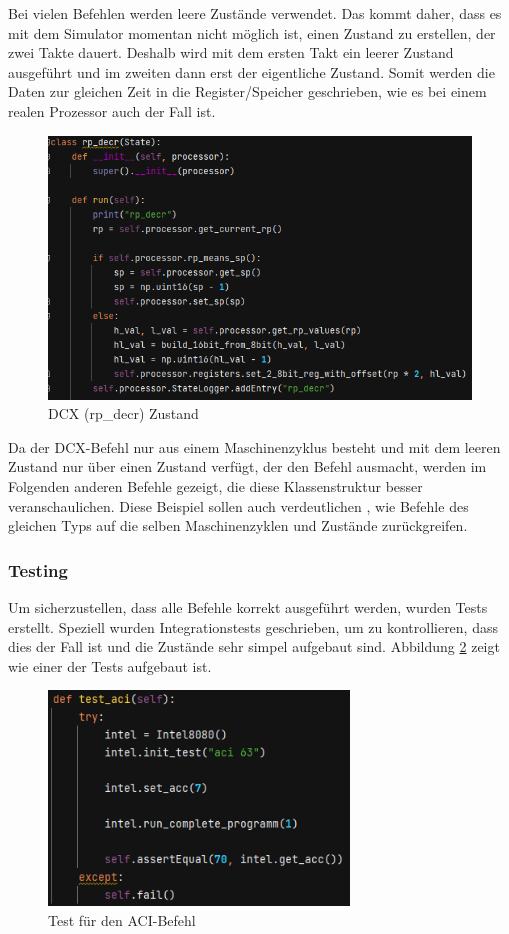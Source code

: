 \documentclass[12pt]{article}
\newcommand{\imgSpaceBefore}{\vspace{10pt}}
\begin{document}
\noindent
Bei vielen Befehlen werden leere Zustände verwendet. Das kommt daher, dass es mit dem Simulator momentan nicht möglich ist, einen Zustand zu erstellen, der zwei Takte dauert. Deshalb wird mit dem ersten Takt ein leerer Zustand ausgeführt und im zweiten dann erst der eigentliche Zustand. Somit werden die Daten zur gleichen Zeit in die Register/Speicher geschrieben, wie es bei einem realen Prozessor auch der Fall ist.

\imgSpaceBefore
\begin{figure}[H]
\centering
\includegraphics[width=14cm]{bilder/dcx_state}
\caption{DCX (rp\_decr) Zustand}
\label{fig:Dcx_state}
\end{figure}

\noindent
Da der DCX-Befehl nur aus einem Maschinenzyklus besteht und mit dem leeren Zustand nur über einen Zustand verfügt, der den Befehl ausmacht, werden im Folgenden anderen Befehle gezeigt, die diese Klassenstruktur besser veranschaulichen. Diese Beispiel sollen auch verdeutlichen , wie Befehle des gleichen Typs auf die selben Maschinenzyklen und Zustände zurückgreifen.

\subsubsection{Testing}
Um sicherzustellen, dass alle Befehle korrekt ausgeführt werden, wurden Tests erstellt. 
Speziell wurden Integrationstests geschrieben, um zu kontrollieren, dass dies der Fall ist und die Zustände sehr simpel aufgebaut sind. Abbildung \ref{fig:test_aci} zeigt wie einer der Tests aufgebaut ist. 

\imgSpaceBefore
\begin{figure}[H]
\centering
\includegraphics[width=8cm]{bilder/test_aci}
\caption{Test für den ACI-Befehl}
\label{fig:test_aci}
\end{figure}
\end{document}
